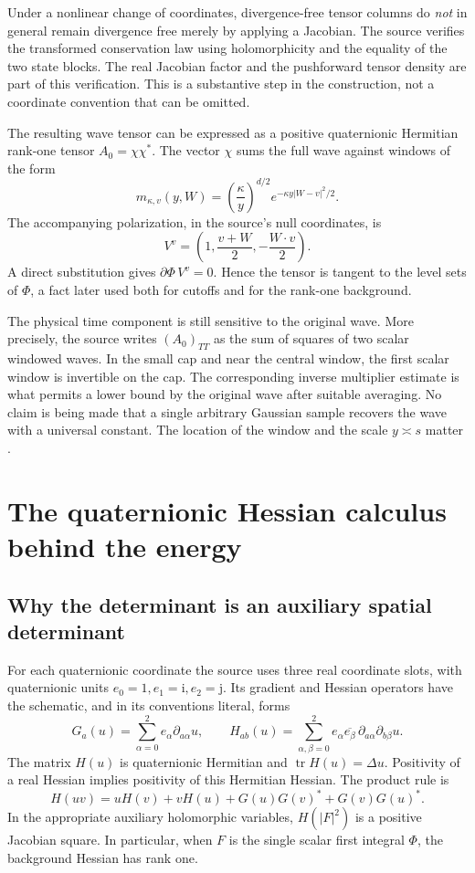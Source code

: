 \documentclass[11pt,a4paper]{article}
\numberwithin{equation}{section}
\theoremstyle{definition}
\theoremstyle{remark}
\newcommand{\tr}{\operatorname{tr}}
\begin{document}
Under a nonlinear change of coordinates, divergence-free tensor columns do
\emph{not} in general remain divergence free merely by applying a Jacobian.
The source verifies the transformed conservation law using holomorphicity and
the equality of the two state blocks. The real Jacobian factor and the
pushforward tensor density are part of this verification. This is a substantive
step in the construction, not a coordinate convention that can be omitted.

The resulting wave tensor can be expressed as a positive quaternionic Hermitian
rank-one tensor $A_0=\chi\chi^*$. The vector $\chi$ sums the full wave against
windows of the form
\begin{equation}\label{eq:window}
 m_{\kappa,v}(y,W)
   =\left(\frac\kappa y\right)^{d/2}
       e^{-\kappa y|W-v|^2/2}.
\end{equation}
The accompanying polarization, in the source's null coordinates, is
\[
 V^v=\left(1,\frac{v+W}{2},-\frac{W\cdot v}{2}\right).
\]
A direct substitution gives $\partial\Phi\,V^v=0$. Hence the tensor is
tangent to the level sets of $\Phi$, a fact later used both for cutoffs and
for the rank-one background.

The physical time component is still sensitive to the original wave. More
precisely, the source writes $(A_0)_{TT}$ as the sum of squares of two scalar
windowed waves. In the small cap and near the central window, the first scalar
window is invertible on the cap. The corresponding inverse multiplier estimate
is what permits a lower bound by the original wave after suitable averaging.
No claim is being made that a single arbitrary Gaussian sample recovers the
wave with a universal constant. The location of the window and the scale
$y\asymp s$ matter \cite{current,barrier}.

\section{The quaternionic Hessian calculus behind the energy}
\label{sec:calculus}
\subsection{Why the determinant is an auxiliary spatial determinant}
For each quaternionic coordinate the source uses three real coordinate slots,
with quaternionic units $e_0=1,e_1=\mathrm i,e_2=\mathrm j$. Its gradient and
Hessian operators have the schematic, and in its conventions literal, forms
\[
 G_a(u)=\sum_{\alpha=0}^2e_\alpha\partial_{a\alpha}u,
 \qquad
 H_{ab}(u)=\sum_{\alpha,\beta=0}^2
 e_\alpha\overline{e_\beta}\,
             \partial_{a\alpha}\partial_{b\beta}u.
\]
The matrix $H(u)$ is quaternionic Hermitian and $\tr H(u)=\Delta u$.
Positivity of a real Hessian implies positivity of this Hermitian Hessian.
The product rule is
\begin{equation}\label{eq:producthess}
 H(uv)=uH(v)+vH(u)+G(u)G(v)^*+G(v)G(u)^*.
\end{equation}
In the appropriate auxiliary holomorphic variables,
$H(|F|^2)$ is a positive Jacobian square. In particular, when $F$ is the
single scalar first integral $\Phi$, the background Hessian has rank one.
\end{document}
